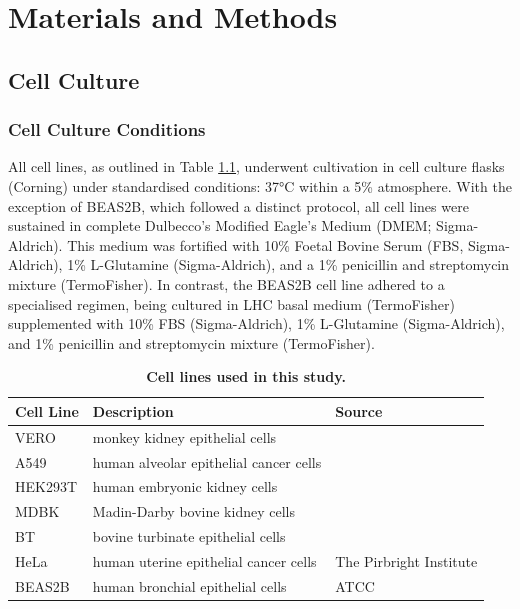 \chapter{Materials and Methods} \label{ch:Materials and Methods}
\section{Cell Culture} \label{sec:Cell Culture}
\subsection{Cell Culture Conditions} \label{subsec:Cell Culture Conditions}
All cell lines, as outlined in Table \ref{tab:Cell Lines Table}, underwent cultivation in cell culture flasks (Corning) under standardised conditions: 37°C within a 5\%  atmosphere. With the exception of BEAS2B, which followed a distinct protocol, all cell lines were sustained in complete Dulbecco’s Modified Eagle's Medium (DMEM; Sigma-Aldrich). This medium was fortified with 10\% Foetal Bovine Serum (FBS, Sigma-Aldrich), 1\% L-Glutamine (Sigma-Aldrich), and a 1\% penicillin and streptomycin mixture (TermoFisher). In contrast, the BEAS2B cell line adhered to a specialised regimen, being cultured in LHC basal medium (TermoFisher) supplemented with 10\% FBS (Sigma-Aldrich), 1\% L-Glutamine (Sigma-Aldrich), and 1\% penicillin and streptomycin mixture (TermoFisher).

\begin{table}
  \centering
  \begin{tabular}{lll}
    \toprule
    {\textbf{Cell Line}} &
  {\textbf{Description}} &
  {\textbf{Source}} \\ \midrule
    VERO & monkey kidney epithelial cells & \\ 
    A549 & human alveolar epithelial cancer cells &   \\
    HEK293T & human embryonic kidney cells &  \\ 
    MDBK & Madin-Darby bovine kidney cells &  \\
    BT & bovine turbinate epithelial cells &  \\
    HeLa & human uterine epithelial cancer cells &
    \multirow{-6}{*}{The Pirbright Institute}
    \\
    BEAS2B & human bronchial epithelial cells & ATCC  \\ \bottomrule
  \end{tabular}
  \caption[Cell lines used in this study.]{\textbf{Cell lines used in this study.}}
  \label{tab:Cell Lines Table}
\end{table}

